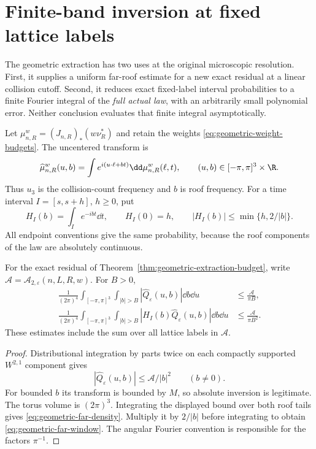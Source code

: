 \section{Finite-band inversion at fixed lattice labels}
\label{sec:microscopic-finite-band}
The geometric extraction has two uses at the original microscopic
resolution. First, it supplies a uniform far-roof estimate for a new
exact residual at a linear collision cutoff. Second, it reduces exact
fixed-label interval probabilities to a finite Fourier integral of the
\emph{full actual law}, with an arbitrarily small polynomial error.
Neither conclusion evaluates that finite integral asymptotically.

Let $\mu_{n,R}^w=(J_{n,R})_*(w\nu_R^*)$ and retain the weights
\eqref{eq:geometric-weight-budgets}. The uncentered transform is
\[
 \widehat\mu_{n,R}^w(u,b)=\int e^{i(u\cdot\ell+bt)}\dd\mu_{n,R}^w(\ell,t),
 \qquad (u,b)\in[-\pi,\pi]^3\times\R.
\]
Thus $u_3$ is the collision-count frequency and $b$ is roof frequency.
For a time interval $I=[s,s+h]$, $h\ge0$, put
\begin{equation}\label{eq:microscopic-interval-transform}
 H_I(b)=\int_Ie^{-ibt}\dd t,
 \qquad H_I(0)=h,
 \qquad |H_I(b)|\le\min\{h,2/|b|\}.
\end{equation}
All endpoint conventions give the same probability, because the roof
components of the law are absolutely continuous.

\begin{proposition}
\label{prop:geometric-far-roof}
For the exact residual of Theorem~\ref{thm:geometric-extraction-budget},
write $\mathcal A=\mathcal A_{2,\varepsilon}(n,L,R,w)$. For $B>0$,
\begin{align}
 \frac1{(2\pi)^4}\int_{[-\pi,\pi]^3}\int_{|b|>B}
                         |\widehat Q_\varepsilon(u,b)|\dd b\dd u
       &\le\frac{\mathcal A}{\pi B},
                 \label{eq:geometric-far-density}\\
 \frac1{(2\pi)^4}\int_{[-\pi,\pi]^3}\int_{|b|>B}
                |H_I(b)\widehat Q_\varepsilon(u,b)|\dd b\dd u
       &\le\frac{\mathcal A}{\pi B^2}.
                 \label{eq:geometric-far-window}
\end{align}
These estimates include the sum over all lattice labels in $\mathcal A$.
\end{proposition}
\begin{proof}
Distributional integration by parts twice on each compactly supported
$W^{2,1}$ component gives
\[
 |\widehat Q_\varepsilon(u,b)|\le\mathcal A/|b|^2\qquad(b\ne0).
\]
For bounded $b$ its transform is bounded by $M$, so absolute inversion
is legitimate. The torus volume is $(2\pi)^3$. Integrating the displayed
bound over both roof tails gives \eqref{eq:geometric-far-density}.
Multiply it by $2/|b|$ before integrating to obtain
\eqref{eq:geometric-far-window}. The angular Fourier convention is
responsible for the factors $\pi^{-1}$.
\end{proof}

